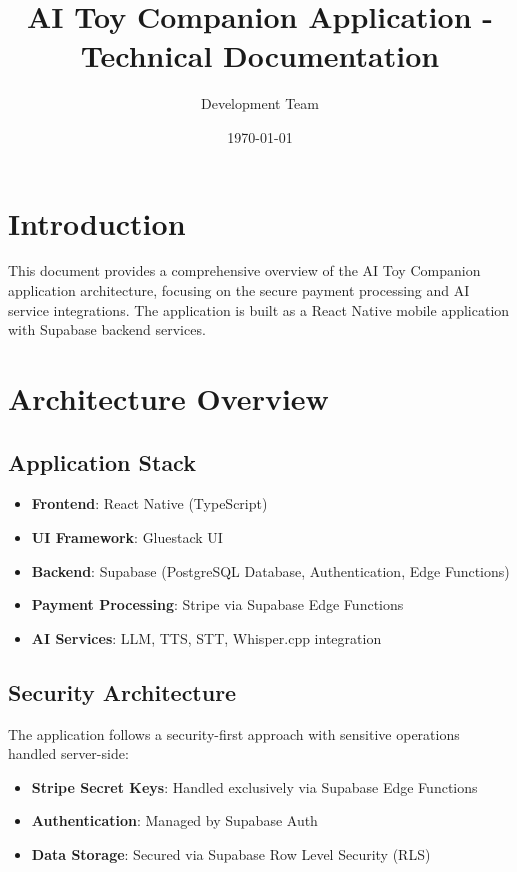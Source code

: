 \documentclass[11pt,a4paper]{article}
\title{AI Toy Companion Application - Technical Documentation}
\author{Development Team}
\date{\today}
\begin{document}
\maketitle

\section{Introduction}

This document provides a comprehensive overview of the AI Toy Companion application architecture, focusing on the secure payment processing and AI service integrations. The application is built as a React Native mobile application with Supabase backend services.

\section{Architecture Overview}

\subsection{Application Stack}
\begin{itemize}
    \item \textbf{Frontend}: React Native (TypeScript)
    \item \textbf{UI Framework}: Gluestack UI
    \item \textbf{Backend}: Supabase (PostgreSQL Database, Authentication, Edge Functions)
    \item \textbf{Payment Processing}: Stripe via Supabase Edge Functions
    \item \textbf{AI Services}: LLM, TTS, STT, Whisper.cpp integration
\end{itemize}

\subsection{Security Architecture}
The application follows a security-first approach with sensitive operations handled server-side:

\begin{itemize}
    \item \textbf{Stripe Secret Keys}: Handled exclusively via Supabase Edge Functions
    \item \textbf{Authentication}: Managed by Supabase Auth
    \item \textbf{Data Storage}: Secured via Supabase Row Level Security (RLS)
\end{itemize}
\end{document}
